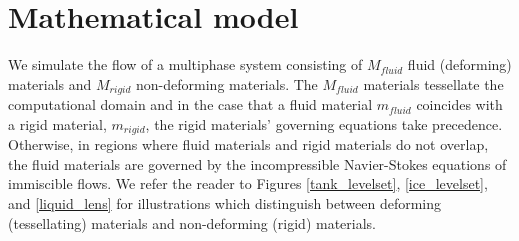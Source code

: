 \documentclass[]{article}
\begin{document}
\section{Mathematical model}
We simulate the flow of a multiphase system consisting of $M_{fluid}$
fluid (deforming) materials and $M_{rigid}$ non-deforming materials.
The $M_{fluid}$ materials tessellate the computational domain and in the
case that a fluid material $m_{fluid}$ coincides with a rigid material,
$m_{rigid}$, the rigid materials' governing equations take precedence.
Otherwise, in regions where fluid materials and rigid materials do not
overlap, the fluid materials are
governed by the incompressible Navier-Stokes equations of immiscible
flows.   We refer the reader to Figures \ref{tank_levelset},
\ref{ice_levelset}, and \ref{liquid_lens} for illustrations which 
distinguish between deforming (tessellating) materials and non-deforming
(rigid) materials.
\end{document}
